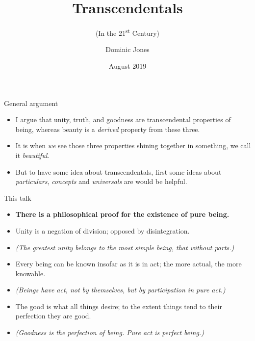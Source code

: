 \documentclass[xcolor=dvipsnames]{beamer}
\title{Transcendentals}
\subtitle{(In the 21\textsuperscript{st} Century)}
\author{Dominic Jones}
\date{\small{August 2019}}
\institute{\small{University of Buckingham}}
\begin{document}
\begin{frame}[plain]
  \titlepage
\end{frame}


\begin{frame}[fragile]{General argument}
  \begin{itemize}
  \item I argue that unity, truth, and goodness are transcendental properties of being, whereas beauty is a \emph{derived} property from these three.\vspace{6mm}
  \item It is when \emph{we} see those three properties shining together in something, we call it \emph{beautiful}.\vspace{5mm}
  \item But to have some idea about transcendentals, first some ideas about \emph{particulars}, \emph{concepts} and \emph{universals} are would be helpful.
  \end{itemize}
\end{frame}


\begin{frame}[fragile]{This talk}
  \begin{itemize}
  \item \textbf{There is a philosophical proof for the existence of pure being.} \vspace{5mm}
  \item Unity is a negation of division; opposed by disintegration. \vspace{2mm}
  \item \emph{(The greatest unity belongs to the most simple being, that without parts.)}\vspace{2mm}
  \item Every being can be known insofar as it is in act; the more actual, the more knowable. \vspace{2mm}
  \item \emph{(Beings have act, not by themselves, but by participation in pure act.)}\vspace{2mm}
  \item The good is what all things desire; to the extent things tend to their perfection they are good. \vspace{2mm}
  \item \emph{(Goodness is the perfection of being. Pure act is perfect being.)}\vspace{2mm}
  \end{itemize}
\end{frame}
\end{document}
